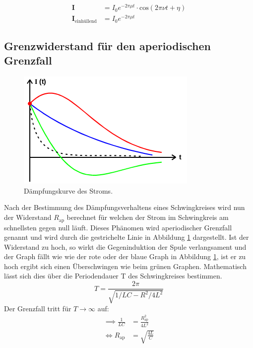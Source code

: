 \begin{align}
  \symbf{I} &= I_0 e^{-2\pi\mu t}
  \cdot\text{cos}\left(2\pi\nu t+\eta\right)\\
  \symbf{I}_\text{einhüllend} &= I_0 e^{-2\pi\mu t}
  \label{eqn:einhuellend}
\end{align}

\subsection{Grenzwiderstand für den aperiodischen Grenzfall}

\begin{figure}[H]
  \centering
  \includegraphics{content/images/dia2.png}
  \caption{Dämpfungskurve des Stroms.}
  \label{fig:aperiodisch}
\end{figure}

Nach der Bestimmung des Dämpfungsverhaltens eines Schwingkreises
wird nun der Widerstand $R_\text{ap}$ berechnet für welchen der
Strom im Schwingkreis am schnellsten gegen null läuft. Dieses
Phänomen wird aperiodischer Grenzfall genannt und wird durch
die gestrichelte Linie in Abbildung \ref{fig:aperiodisch}
dargestellt. Ist der Widerstand zu hoch, so wirkt die Gegeninduktion der
Spule verlangsament und der Graph fällt wie wie der rote oder der
blaue Graph in Abbildung \ref{fig:aperiodisch}, ist er zu hoch
ergibt sich einen Überschwingen wie beim grünen Graphen.
Mathematisch lässt sich dies über die Periodendauer T des
Schwingkreises bestimmen.
\begin{equation}
  T = \frac{2\pi}{\sqrt{1/LC-R^2/4L^2}}
\end{equation}
Der Grenzfall tritt für $T\to\infty$ auf:
\begin{align}
  \implies \frac{1}{LC}&=\frac{R_\text{ap}^2}{4L^2}\\
  \iff R_\text{ap} &=\sqrt{\frac{4L}{C}}
\end{align}
